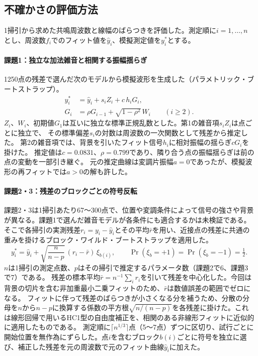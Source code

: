 \documentclass[dvipdfmx,a4paper,11pt]{jsarticle}
\begin{document}
\subsection{不確かさの評価方法}
\label{sec:analysis-uncertainty}
1掃引から求めた共鳴周波数と線幅のばらつきを評価した。測定順に$i=1,\ldots,n$とし、周波数$f_i$でのフィット値を$\hat y_i$、模擬測定値を$y_i^*$とする。

\paragraph{課題1：独立な加法雑音と相関する振幅揺らぎ}
1250点の残差で選んだ次のモデルから模擬波形を生成した（パラメトリック・ブートストラップ\cite{efron_bootstrap}）。
\begin{align}
 y_i^* &= \hat y_i + s_i Z_i + c\,h_i G_i, \label{eq:noise-task1}\\
 G_i &= \rho G_{i-1}+\sqrt{1-\rho^2}\,W_i \qquad (i\geq 2).
\end{align}
$Z_i$、$W_i$、初期値$G_1$は互いに独立な標準正規乱数とした。第1の雑音項$s_i Z_i$は点ごとに独立で、
その標準偏差$s_i$の対数は周波数の一次関数として残差から推定した。
第2の雑音項では、背景を引いたフィット信号$h_i$に相対振幅の揺らぎ$cG_i$を掛けた。
推定値は$c=0.0831$、$\rho=0.799$であり、隣り合う点の振幅揺らぎは前の点の変動を一部引き継ぐ。
元の推定曲線は変調片振幅$a=0$であったが、模擬波形の再フィットでは$a>0$の解も許した。

\paragraph{課題2・3：残差のブロックごとの符号反転}
課題2・3は1掃引あたり67～300点で、位置や変調条件によって信号の強さや背景が異なる。課題1で選んだ雑音モデルが各条件にも適合するかは未検証である。
そこで各掃引の実測残差$r_i=y_i-\hat y_i$とその平均$\bar r$を用い、近接点の残差に共通の重みを掛けるブロック・ワイルド・ブートストラップ\cite{smeekes_wilms_bwb}を適用した。
\begin{equation}
 y_i^*=\hat y_i+\sqrt{\frac{n}{n-p}}\,(r_i-\bar r)\,\xi_{b(i)},
 \qquad \Pr(\xi_b=+1)=\Pr(\xi_b=-1)=\tfrac12 .
 \label{eq:noise-block}
\end{equation}
$n$は1掃引の測定点数、$p$はその掃引で推定するパラメータ数（課題2で6、課題3で7）である。
残差の標本平均$\bar r=n^{-1}\sum_i r_i$を引いて残差を中心化した。今回は背景の切片を含む非加重最小二乗フィットのため、$\bar r$は数値誤差の範囲でゼロになる。
フィットに伴って残差のばらつきが小さくなる分を補うため、分散の分母を$n$から$n-p$に換算する係数の平方根$\sqrt{n/(n-p)}$を各残差に掛けた。これは線形回帰で用いるHC1型の自由度補正\cite{mackinnon_hc1}を、相関のある非線形フィットに近似的に適用したものである。
測定順に$\lceil n^{1/3}\rceil$点（5～7点）ずつに区切り、試行ごとに開始位置を無作為にずらした。点$i$を含むブロック$b(i)$ごとに符号を独立に選び、補正した残差を元の周波数で元のフィット曲線$\hat y_i$に加えた。
\end{document}

